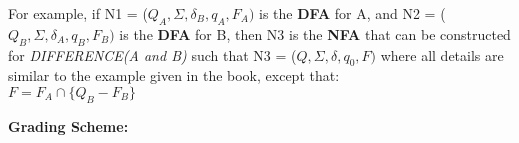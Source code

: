 \documentclass[11pt, article, oneside]{memoir}
\begin{document}
\begin{enumerate}
        For example, if N1 = (\(Q_A, \Sigma, \delta_B, q_A, F_A)\) is the \textbf{DFA} for A, and N2 = (\(Q_B, \Sigma, \delta_A, q_B, F_B)\) is the \textbf{DFA} for B, then N3 is the \textbf{NFA} that can be constructed for \textit{DIFFERENCE(A and B)} such that N3 = (\(Q, \Sigma, \delta, q_0, F)\) where all details are similar to the example given in the book, except that:
        \\\(F = F_A \cap \{Q_B - F_B\} \)

        \textbf{Grading Scheme:}
\end{enumerate}















\end{document}
